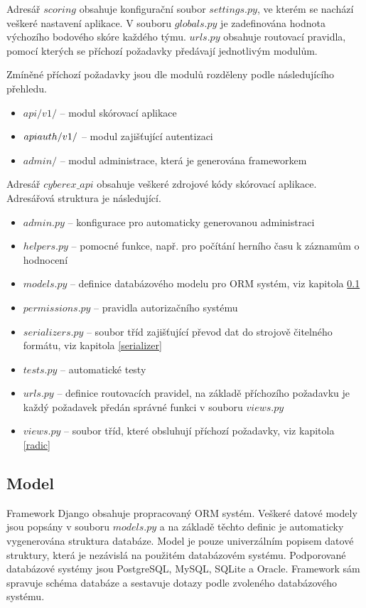 \documentclass[
  digital, %
  twoside, %
  table,   %
  nolof,     %
  nolot,     %
]{fithesis3}
\begin{document}
Adresář $scoring$ obsahuje konfigurační soubor $settings.py$, ve kterém se nachází veškeré nastavení aplikace. V souboru $globals.py$ je zadefinována hodnota výchozího bodového skóre každého týmu. $urls.py$ obsahuje routovací pravidla, pomocí kterých se příchozí požadavky předávají jednotlivým modulům.

Zmíněné příchozí požadavky jsou dle modulů rozděleny podle následujícího přehledu.

\begin{itemize}
    \item $api/v1/$ -- modul skórovací aplikace
    \item $api\-auth/v1/$ -- modul zajišťující autentizaci
    \item $admin/$ -- modul administrace, která je generována frameworkem
\end{itemize}

Adresář $cyberex\_api$ obsahuje veškeré zdrojové kódy skórovací aplikace. Adresářová struktura je následující.

\begin{itemize}
    \item $admin.py$ -- konfigurace pro automaticky generovanou administraci
    \item $helpers.py$ -- pomocné funkce, např. pro počítání herního času k záznamům o hodnocení
    \item $models.py$ -- definice databázového modelu pro ORM systém, viz kapitola \ref{model}
    \item $permissions.py$ -- pravidla autorizačního systému
    \item $serializers.py$ -- soubor tříd zajišťující převod dat do strojově čitelného formátu, viz kapitola \ref{serializer}
    \item $tests.py$ -- automatické testy
    \item $urls.py$ -- definice routovacích pravidel, na základě příchozího požadavku je každý požadavek předán správné funkci v souboru $views.py$
    \item $views.py$ -- soubor tříd, které obsluhují příchozí požadavky, viz kapitola \ref{radic}
\end{itemize}

\subsection{Model}
\label{model}
Framework Django obsahuje propracovaný ORM systém. Veškeré datové modely jsou popsány v souboru $models.py$ a na základě těchto definic je automaticky vygenerována struktura databáze. Model je pouze univerzálním popisem datové struktury, která je nezávislá na použitém databázovém systému. Podporované databázové systémy jsou PostgreSQL, MySQL, SQLite a Oracle. Framework sám spravuje schéma databáze a sestavuje dotazy podle zvoleného databázového systému.
\end{document}
